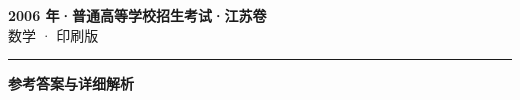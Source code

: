 \documentclass[zihao=5, a4paper]{ctexart}
\begin{document}
\begin{center}
  {\Large\bfseries 2006 年·普通高等学校招生考试·江苏卷}\\[4pt]
  {\large 数学 · 印刷版}
\end{center}
\medskip
{}

\par\bigskip\hrule\bigskip
{}
\begin{center}{\large\bfseries 参考答案与详细解析}\end{center}
\smallskip

\end{document}
